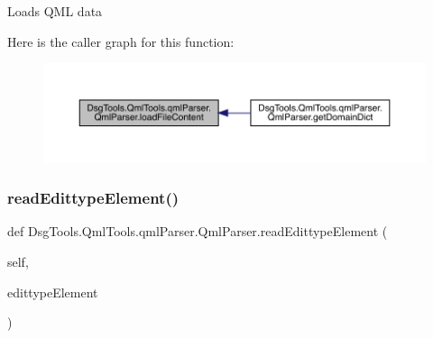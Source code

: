 \begin{DoxyVerb}Loads QML data
\end{DoxyVerb}
 Here is the caller graph for this function\+:
\nopagebreak
\begin{figure}[H]
\begin{center}
\leavevmode
\includegraphics[width=350pt]{class_dsg_tools_1_1_qml_tools_1_1qml_parser_1_1_qml_parser_a11dae4c91d4e530b145265047b6f20de_icgraph}
\end{center}
\end{figure}
\mbox{\label{class_dsg_tools_1_1_qml_tools_1_1qml_parser_1_1_qml_parser_a76b213f382b5af36a915fc319f6d24bc}} 
\subsubsection{\texorpdfstring{read\+Edittype\+Element()}{readEdittypeElement()}}
{\footnotesize\ttfamily def Dsg\+Tools.\+Qml\+Tools.\+qml\+Parser.\+Qml\+Parser.\+read\+Edittype\+Element (\begin{DoxyParamCaption}\item[{}]{self,  }\item[{}]{edittype\+Element }\end{DoxyParamCaption})}

